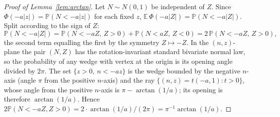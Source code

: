 \documentclass[11pt]{article}
\theoremstyle{definition}
\newcommand{\E}{\mathbb{E}}
\newcommand{\Prob}{\mathbb{P}}
\begin{document}
\begin{proof}[Proof of Lemma~\ref{lem:arctan}]
Let $N\sim N(0,1)$ be independent of $Z$. Since $\Phi(-a|z|)=\Prob(N<-a|z|)$ for each fixed $z$, $\E\,\Phi(-a|Z|)=\Prob(N<-a|Z|)$. Split according to the sign of $Z$:
\[
\Prob(N<-a|Z|)=\Prob(N<-aZ,\,Z>0)+\Prob(N<aZ,\,Z<0)=2\,\Prob(N<-aZ,\,Z>0),
\]
the second term equalling the first by the symmetry $Z\mapsto-Z$. In the $(n,z)$-plane the pair $(N,Z)$ has the rotation-invariant standard bivariate normal law, so the probability of any wedge with vertex at the origin is its opening angle divided by $2\pi$. The set $\{z>0,\ n<-az\}$ is the wedge bounded by the negative $n$-axis (angle $\pi$ from the positive $n$-axis) and the ray $\{(n,z)=t(-a,1):t>0\}$, whose angle from the positive $n$-axis is $\pi-\arctan(1/a)$; its opening is therefore $\arctan(1/a)$. Hence $2\Prob(N<-aZ,Z>0)=2\cdot\arctan(1/a)/(2\pi)=\pi^{-1}\arctan(1/a)$.
\end{proof}
\end{document}
